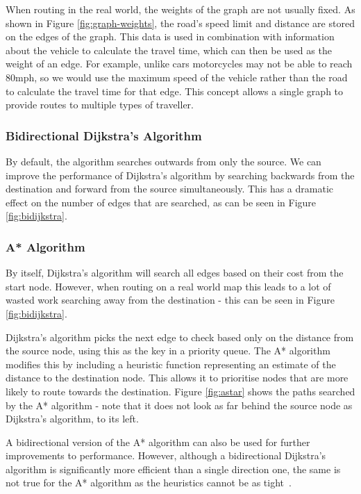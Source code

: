\documentclass[ %
                    author={Alexander Hill},
                supervisor={Dr. Benjamin Sach},
                    degree={MEng},
                     title={MARMOSET},
                  subtitle={Multi-Agent Route Management using Online Simulation for Efficient Transportation},
                      type={research},
                      year={2016} ]{dissertation}
\begin{document}
When routing in the real world, the weights of the graph are not usually fixed.
As shown in Figure \ref{fig:graph-weights}, the road's speed limit and distance
are stored on the edges of the graph. This data is used in combination with
information about the vehicle to calculate the travel time, which can then be
used as the weight of an edge. For example, unlike cars motorcycles may not be
able to reach 80mph, so we would use the maximum speed of the vehicle rather
than the road to calculate the travel time for that edge. This concept allows a
single graph to provide routes to multiple types of traveller.

\subsubsection{Bidirectional Dijkstra's Algorithm}

By default, the algorithm searches outwards from only the source. We can improve
the performance of Dijkstra's algorithm by searching backwards from the
destination and forward from the source simultaneously. This has a dramatic
effect on the number of edges that are searched, as can be seen in Figure
\ref{fig:bidijkstra}.

\subsubsection{A* Algorithm}

By itself, Dijkstra's algorithm will search all edges based on their cost from
the start node. However, when routing on a real world map this leads to a lot of
wasted work searching away from the destination - this can be seen in Figure
\ref{fig:bidijkstra}.

Dijkstra's algorithm picks the next edge to check based only on the distance
from the source node, using this as the key in a priority queue. The A*
algorithm modifies this by including a heuristic function representing an
estimate of the distance to the destination node. This allows it to prioritise
nodes that are more likely to route towards the destination. Figure
\ref{fig:astar} shows the paths searched by the A* algorithm - note that it does
not look as far behind the source node as Dijkstra's algorithm, to its left.

A bidirectional version of the A* algorithm can also be used for further
improvements to performance. However, although a bidirectional Dijkstra's
algorithm is significantly more efficient than a single direction one, the same
is not true for the A* algorithm as the heuristics cannot be as
tight~\cite{astar-bi}.
\end{document}
